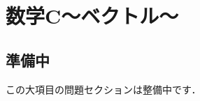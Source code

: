 \documentclass[../../ms_q.tex]{subfiles}
\begin{document}
\section{数学C～ベクトル～}

\subsection*{準備中}
この大項目の問題セクションは整備中です．
\end{document}
